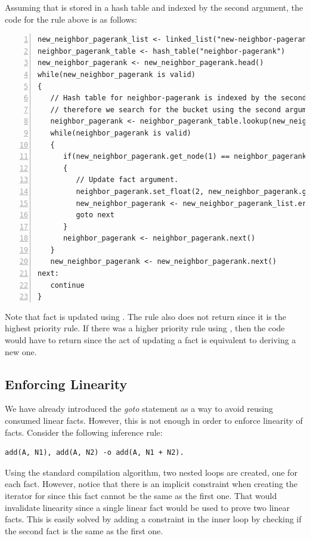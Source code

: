 Assuming that  is stored in a hash table and indexed by
the second argument, the code for the rule above is as follows:

\begin{Verbatim}[numbers=left,fontsize=\codesize]
new_neighbor_pagerank_list <- linked_list("new-neighbor-pagerank")
neighbor_pagerank_table <- hash_table("neighbor-pagerank")
new_neighbor_pagerank <- new_neighbor_pagerank.head()
while(new_neighbor_pagerank is valid)
{
   // Hash table for neighbor-pagerank is indexed by the second argument,
   // therefore we search for the bucket using the second argument of new-neighbor-pagerank.
   neighbor_pagerank <- neighbor_pagerank_table.lookup(new_neighbor_pagerank.get_node(1))
   while(neighbor_pagerank is valid)
   {
      if(new_neighbor_pagerank.get_node(1) == neighbor_pagerank.get_node(1))
      {
         // Update fact argument.
         neighbor_pagerank.set_float(2, new_neighbor_pagerank.get_float(2))
         new_neighbor_pagerank <- new_neighbor_pagerank_list.erase(new_neighbor_pagerank)
         goto next
      }
      neighbor_pagerank <- neighbor_pagerank.next()
   }
   new_neighbor_pagerank <- new_neighbor_pagerank.next()
next:
   continue
}
\end{Verbatim}

Note that  fact is updated using . The
rule also does not return since it is the highest priority rule. If there was a
higher priority rule using , then the code would have to
return since the act of updating a fact is equivalent to deriving a new one.

\subsection{Enforcing Linearity}

We have already introduced the \emph{goto} statement as a way to avoid reusing
consumed linear facts. However, this is not enough in order to enforce
linearity of facts. Consider the following inference rule:

\begin{Verbatim}[fontsize=\codesize]
add(A, N1), add(A, N2) -o add(A, N1 + N2).
\end{Verbatim}

Using the standard compilation algorithm, two nested loops are created, one for
each  fact. However, notice that there is an implicit constraint when
creating the iterator for  since this fact cannot be the same
as the first one. That would invalidate linearity since a single linear fact
would be used to prove two linear facts. This is easily solved by adding a
constraint in the inner loop by checking if the second fact is the same as the
first one.

